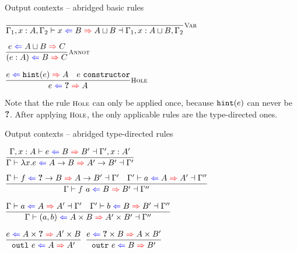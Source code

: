 \documentclass{beamer}
\newcommand{\Fun}[2]{#1 \to #2}
\newcommand{\Prod}[2]{#1 \times #2}
\newcommand{\annot}[2]{(#1 : #2)}
\newcommand{\fun}[2]{\lambda #1. #2}
\newcommand{\app}[2]{#1\ #2}
\newcommand{\pair}[2]{(#1, #2)}
\newcommand{\outl}[1]{\texttt{outl}\ #1}
\newcommand{\outr}[1]{\texttt{outr}\ #1}
\newcommand{\rulename}[1]{\textsc{\footnotesize{#1}}}
\newcommand{\infrule}[3][]{\displaystyle \frac{#2}{#3} \rulename{#1}}
\newcommand{\extend}[3]{#1, #2 : #3}
\newcommand{\sidecond}[1]{#1}
\begin{document}
\begin{frame}{Output contexts -- abridged basic rules}

\begin{center}
  $\infrule[Var]{}{\fulloutctx{\Gamma_1, x : A, \Gamma_2}{x}{B}{\combinehints{A}{B}}{\Gamma_1, x : \combinehints{A}{B}, \Gamma_2}}$

  \vspace{2em}

  $\infrule[Annot]{\shortoutctx{e}{\combinehints{A}{B}}{C}}{\shortoutctx{\annot{e}{A}}{B}{C}}$

  \vspace{2em}

  $\infrule[Hole]{\shortoutctx{e}{\hintfor{e}}{A} \quad \sidecond{e\ \texttt{constructor}}}{\shortoutctx{e}{\Hole}{A}}$
\end{center}

\vspace{2em}

Note that the rule $\rulename{Hole}$ can only be applied once, because $\texttt{hint}(e)$ can never be $\textbf{?}$. After applying $\rulename{Hole}$, the only applicable rules are the type-directed ones.

\end{frame}

\begin{frame}{Output contexts -- abridged type-directed rules}

\begin{center}
  $\infrule{\fulloutctx{\extend{\Gamma}{x}{A}}{e}{B}{B'}{\extend{\Gamma'}{x}{A'}}}{\outctx{\fun{x}{e}}{\Fun{A}{B}}{\Fun{A'}{B'}}}$

  \vspace{1em}

  $\infrule{\fulloutctx{\Gamma}{f}{\Fun{\Hole}{B}}{\Fun{A}{B'}}{\Gamma'} \quad \fulloutctx{\Gamma'}{a}{A}{A'}{\Gamma''}}{\fulloutctx{\Gamma}{\app{f}{a}}{B}{B'}{\Gamma''}}$

  \vspace{1em}

  $\infrule{\fulloutctx{\Gamma}{a}{A}{A'}{\Gamma'} \quad \fulloutctx{\Gamma'}{b}{B}{B'}{\Gamma''}}{\fulloutctx{\Gamma}{\pair{a}{b}}{\Prod{A}{B}}{\Prod{A'}{B'}}{\Gamma''}}$

  \vspace{1em}

  $\infrule{\shortoutctx{e}{\Prod{A}{\Hole}}{\Prod{A'}{B}}}{\shortoutctx{\outl{e}}{A}{A'}}$
  \quad
  $\infrule{\shortoutctx{e}{\Prod{\Hole}{B}}{\Prod{A}{B'}}}{\shortoutctx{\outr{e}}{B}{B'}}$
\end{center}

\end{frame}
\end{document}
